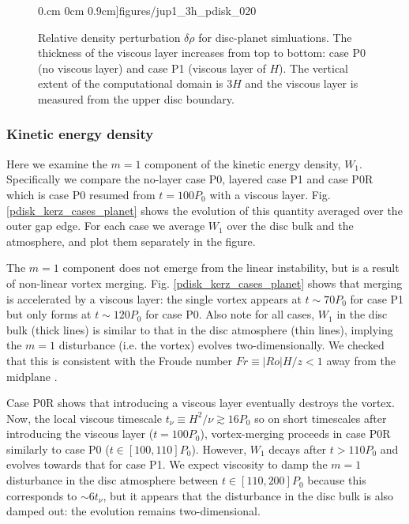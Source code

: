 \begin{figure}
    0.cm 0cm 0.9cm]{figures/jup1_3h_pdisk_020}\\
  \caption{Relative density perturbation $\delta\rho$ for disc-planet
    simluations. The thickness of the viscous layer increases from
    top to bottom: case P0 (no viscous layer) and case P1 (viscous layer of $H$). The
    vertical extent of the computational domain is $3H$ and the
    viscous layer is measured from the upper disc boundary. 
    \label{jup0_3h}}
\end{figure}

\subsubsection{Kinetic energy density}%
Here we examine the $m=1$ component of the kinetic energy
density, $W_1$. Specifically we compare the no-layer case P0, layered
case P1 and case P0R which is case P0 resumed from $t=100P_0$ with a
viscous layer. Fig. \ref{pdisk_kerz_cases_planet} shows the evolution of
this quantity averaged over the outer gap edge. For each case we
average $W_1$ over the disc bulk and the atmosphere, and plot them
separately in the figure. 

The $m=1$ component does not emerge from the linear instability, but is a
result of non-linear vortex merging. 
Fig. \ref{pdisk_kerz_cases_planet} shows that merging is accelerated
by a viscous layer: the single vortex appears at $t\sim70P_0$ for case
P1 but only forms at $t\sim120P_0$ for case P0. Also note for all
cases, $W_1$ in the disc bulk (thick lines) is similar to that in the
disc atmosphere (thin lines), implying the $m=1$ disturbance
(i.e. the vortex) evolves two-dimensionally. We checked that this is
consistent with the Froude number $Fr\equiv|Ro|H/z < 1 $ away from the
midplane \citep{barranco05,oishi09}. 


Case P0R shows that introducing a viscous layer eventually destroys
the vortex. Now, the local viscous timescale $t_\nu\equiv
H^2/\nu\gtrsim 16P_0$ so on short timescales after introducing the 
viscous layer ($t=100P_0$), vortex-merging proceeds in case P0R
similarly to case P0 ($t\in[100,110]P_0$). However, $W_1$ decays after
$t>110P_0$ and evolves towards that for case P1. We expect viscosity
to damp the $m=1$ disturbance in the disc atmosphere between
$t\in[110,200]P_0$ because this corresponds to $\sim 6 t_\nu$, but it
appears that the disturbance in the disc bulk is also damped out: the
evolution remains two-dimensional.   


